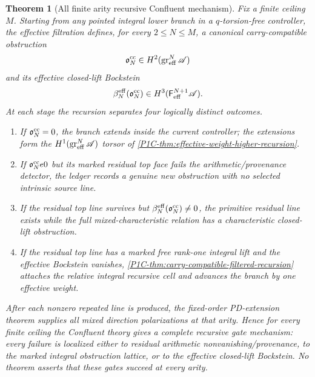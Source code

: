 \documentclass[11pt]{article}
\newtheorem{theorem}{Theorem}[section]
\theoremstyle{remark}
\begin{document}
\begin{theorem}[All finite arity recursive Confluent mechanism]
\label{P1C-thm:all-finite-arity-confluent-recursion}
Fix a finite ceiling $M$.  Starting from any pointed integral lower branch in a $q$-torsion-free
controller, the effective filtration defines, for every $2\le N\le M$, a canonical carry-compatible
obstruction
\[
 \mathfrak o_N^{\rm cc}
 \in H^2(\operatorname{gr}^{N}_{\rm eff}\mathscr A)
\]
and its effective closed-lift Bockstein
\[
 \beta_N^{\rm eff}(\mathfrak o_N^{\rm cc})
 \in H^3(\mathsf F_{\rm eff}^{N+1}\mathscr A).
\]
At each stage the recursion separates four logically distinct outcomes.
\begin{enumerate}[label=\textup{(\alph*)}]
\item If $\mathfrak o_N^{\rm cc}=0$, the branch extends inside the current controller; the extensions
form the $H^1(\operatorname{gr}^{N}_{\rm eff}\mathscr A)$ torsor of
\cref{P1C-thm:effective-weight-higher-recursion}.
\item If $\mathfrak o_N^{\rm cc}
e0$ but its marked residual top face fails the arithmetic/provenance
detector, the ledger records a genuine new obstruction with no selected intrinsic source line.
\item If the residual top line survives but
$\beta_N^{\rm eff}(\mathfrak o_N^{\rm cc})\ne0$, the primitive residual line exists while the full
mixed-characteristic relation has a characteristic closed-lift obstruction.
\item If the residual top line has a marked free rank-one integral lift and the effective Bockstein
vanishes, \cref{P1C-thm:carry-compatible-filtered-recursion} attaches the relative integral recursive cell
and advances the branch by one effective weight.
\end{enumerate}
After each nonzero repeated line is produced, the fixed-order PD-extension theorem supplies all mixed
direction polarizations at that arity.  Hence for every finite ceiling the Confluent theory gives a
complete \emph{recursive gate mechanism}: every failure is localized either to residual arithmetic
nonvanishing/provenance, to the marked integral obstruction lattice, or to the effective closed-lift
Bockstein.  No theorem asserts that these gates succeed at every arity.


\end{theorem}
\end{document}

